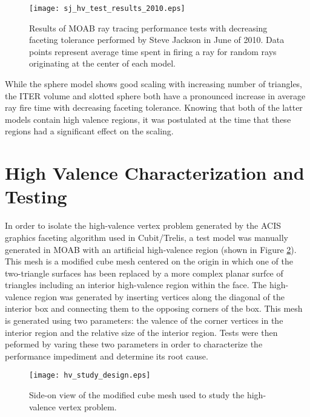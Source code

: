 \begin{figure}[H]
  \begin{center}
    \texttt{[image: sj\_hv\_test\_results\_2010.eps]} \\
    \caption{Results of MOAB ray tracing performance tests with decreasing
      faceting tolerance performed by Steve Jackson in June of 2010. Data points
      represent average time spent in firing a ray for random rays
      originating at the center of each model.}
    \label{fig:sj_hv_test_results}
  \end{center}
\end{figure}

While the sphere model shows good scaling with increasing number of triangles,
the ITER volume and slotted sphere both have a pronounced increase in average
ray fire time with decreasing faceting tolerance. Knowing that both of the
latter models contain high valence regions, it was postulated at the time that
these regions had a significant effect on the scaling. 

\section{High Valence Characterization and Testing}

In order to isolate the high-valence vertex problem generated by the ACIS
graphics faceting algorithm used in Cubit/Trelis, a test model was manually
generated in MOAB with an artificial high-valence region (shown in Figure
\ref{fig:hv_cube_design}). This mesh is a modified cube mesh centered on the
origin in which one of the two-triangle surfaces has been replaced by a more
complex planar surfce of triangles including an interior high-valence region
within the face. The high-valence region was generated by inserting vertices
along the diagonal of the interior box and connecting them to the opposing
corners of the box. This mesh is generated using two parameters: the valence of
the corner vertices in the interior region and the relative size of the interior
region. Tests were then peformed by varing these two parameters in order to
characterize the performance impediment and determine its root cause.

\begin{figure}[H]
  \centering
    \texttt{[image: hv\_study\_design.eps]}
    \caption{Side-on view of the modified cube mesh used to study the
      high-valence vertex problem.}
    \label{fig:hv_cube_design}
\end{figure}


